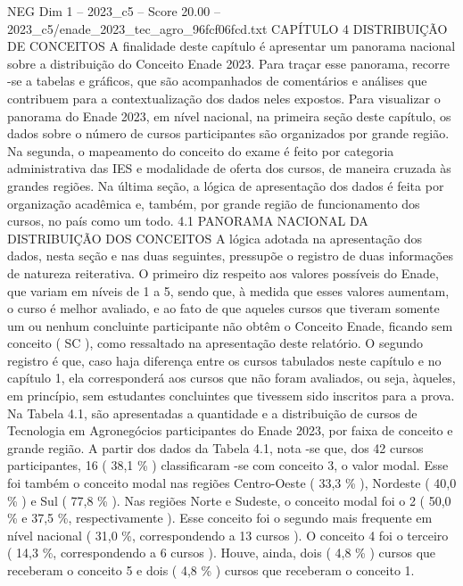 \begin{textsample}{NEG Dim 1 – 2023\_c5 – Score 20.00 – 2023\_c5/enade\_2023\_tec\_agro\_96fcf06fcd.txt}  \label{ex:f1_neg_423}
CAPÍTULO 4 DISTRIBUIÇÃO DE CONCEITOS A finalidade deste capítulo é apresentar um panorama nacional sobre a distribuição do Conceito Enade 2023.
Para traçar esse panorama, recorre -se a tabelas e gráficos, que são acompanhados de comentários e análises que contribuem para a contextualização dos dados neles expostos.
Para visualizar o panorama do Enade 2023, em nível nacional, na primeira seção deste capítulo, os dados sobre o número de cursos participantes são organizados por grande região.
Na segunda, o mapeamento do conceito do exame é feito por categoria administrativa das IES e modalidade de oferta dos cursos, de maneira cruzada às grandes regiões.
Na última seção, a lógica de apresentação dos dados é feita por organização acadêmica e, também, por grande região de funcionamento dos cursos, no país como um todo. 4.1 PANORAMA NACIONAL DA DISTRIBUIÇÃO DOS CONCEITOS A lógica adotada na apresentação dos dados, nesta seção e nas duas seguintes, pressupõe o registro de duas informações de natureza reiterativa.
O primeiro diz respeito aos valores possíveis do Enade, que variam em níveis de 1 a 5, sendo que, à medida que esses valores aumentam, o curso é melhor avaliado, e ao fato de que aqueles cursos que tiveram somente um ou nenhum concluinte participante não obtêm o Conceito Enade, ficando sem conceito ( SC ), como ressaltado na apresentação deste relatório.
O segundo registro é que, caso haja diferença entre os cursos tabulados neste capítulo e no capítulo 1, ela corresponderá aos cursos que não foram avaliados, ou seja, àqueles, em princípio, sem estudantes concluintes que tivessem sido inscritos para a prova.
Na Tabela 4.1, são apresentadas a quantidade e a distribuição de cursos de Tecnologia em Agronegócios participantes do Enade 2023, por faixa de conceito e grande região.
A partir dos dados da Tabela 4.1, nota -se que, dos 42 cursos participantes, 16 ( 38,1 \% ) classificaram -se com conceito 3, o valor modal.
Esse foi também o conceito modal nas regiões Centro-Oeste ( 33,3 \% ), Nordeste ( 40,0 \% ) e Sul ( 77,8 \% ).
Nas regiões Norte e Sudeste, o conceito modal foi o 2 ( 50,0 \% e 37,5 \%, respectivamente ).
Esse conceito foi o segundo mais frequente em nível nacional ( 31,0 \%, correspondendo a 13 cursos ).
O conceito 4 foi o terceiro ( 14,3 \%, correspondendo a 6 cursos ).
Houve, ainda, dois ( 4,8 \% ) cursos que receberam o conceito 5 e dois ( 4,8 \% ) cursos que receberam o conceito 1.

\end{textsample}
